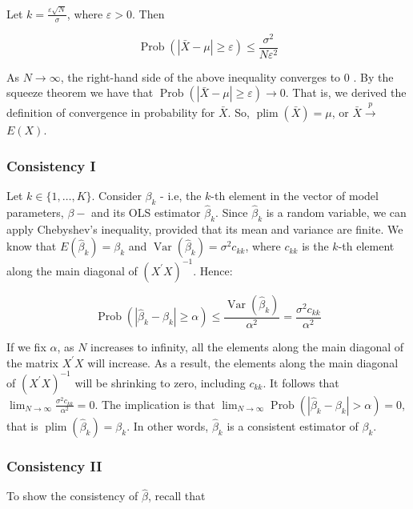 Let $k=\frac{\varepsilon \sqrt{N}}{\sigma}$, where $\varepsilon>0$. Then

$$
\operatorname{Prob}(|\bar{X}-\mu| \geq \varepsilon) \leq \frac{\sigma^{2}}{N \varepsilon^{2}}
$$

As $N \longrightarrow \infty$, the right-hand side of the above inequality converges to 0 . By the squeeze theorem we have that $\operatorname{Prob}(|\bar{X}-\mu| \geq \varepsilon) \longrightarrow 0$. That is, we derived the definition of convergence in probability for $\bar{X}$. So, $\operatorname{plim}(\bar{X})=\mu$, or $\bar{X} \xrightarrow{p}$ $E(X)$.

\subsubsection{Consistency I}
Let $k \in\{1, \ldots, K\}$. Consider $\beta_{k}$ - i.e, the $k$-th element in the vector of model parameters, $\beta-$ and its OLS estimator $\widehat{\beta}_{k}$. Since $\widehat{\beta}_{k}$ is a random variable, we can apply Chebyshev's inequality, provided that its mean and variance are finite. We know that $E\left(\widehat{\beta}_{k}\right)=\beta_{k}$ and $\operatorname{Var}\left(\widehat{\beta}_{k}\right)=\sigma^{2} c_{k k}$, where $c_{k k}$ is the $k$-th element along the main diagonal of $\left(X^{\prime} X\right)^{-1}$. Hence:

$$
\operatorname{Prob}\left(\left|\widehat{\beta}_{k}-\beta_{k}\right| \geq \alpha\right) \leq \frac{\operatorname{Var}\left(\widehat{\beta}_{k}\right)}{\alpha^{2}}=\frac{\sigma^{2} c_{k k}}{\alpha^{2}}
$$

If we fix $\alpha$, as $N$ increases to infinity, all the elements along the main diagonal of the matrix $X^{\prime} X$ will increase. As a result, the elements along the main diagonal of $\left(X^{\prime} X\right)^{-1}$ will be shrinking to zero, including $c_{k k}$. It follows that $\lim _{N \rightarrow \infty} \frac{\sigma^{2} c_{k k}}{\alpha^{2}}=0$. The implication is that $\lim _{N \rightarrow \infty} \operatorname{Prob}\left(\left|\widehat{\beta}_{k}-\beta_{k}\right|>\alpha\right)=0$, that is $\operatorname{plim}\left(\widehat{\beta}_{k}\right)=\beta_{k}$. In other words, $\widehat{\beta}_{k}$ is a consistent estimator of $\beta_{k}$.

\subsubsection{Consistency II}
To show the consistency of $\widehat{\beta}$, recall that

